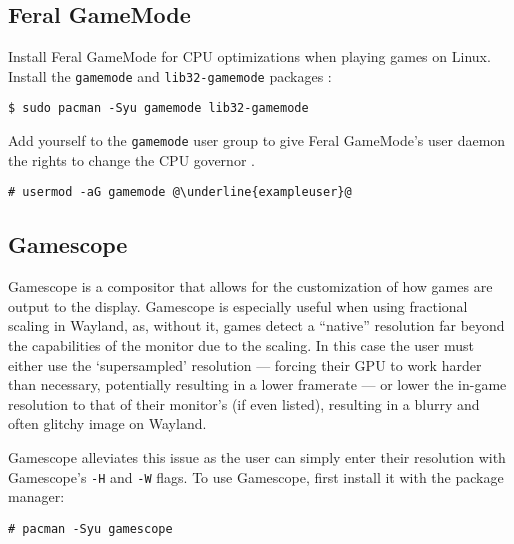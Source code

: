 \documentclass[a4paper]{article}
\begin{document}
\subsection{Feral GameMode}

Install Feral GameMode for CPU optimizations when playing games on Linux.
Install the \lstinline|gamemode| and \lstinline|lib32-gamemode| packages \cite{arch-wiki-gamemode}:

\begin{lstlisting}
$ sudo pacman -Syu gamemode lib32-gamemode
\end{lstlisting}

Add yourself to the \lstinline|gamemode| user group to give Feral GameMode's user daemon the rights to change the CPU governor \cite{arch-wiki-gamemode}.
\begin{lstlisting}[escapechar=@]
# usermod -aG gamemode @\underline{exampleuser}@
\end{lstlisting}

\subsection{Gamescope}

Gamescope is a compositor that allows for the customization of how games are output to the display.
Gamescope is especially useful when using fractional scaling in Wayland, as, without it, games detect a ``native'' resolution far beyond the capabilities of the monitor due to the scaling.
In this case the user must either use the `supersampled' resolution --- forcing their GPU to work harder than necessary, potentially resulting in a lower framerate --- or lower the in-game resolution to that of their monitor's (if even listed), resulting in a blurry and often glitchy image on Wayland.

Gamescope alleviates this issue as the user can simply enter their resolution with Gamescope's \lstinline|-H| and \lstinline|-W| flags.
To use Gamescope, first install it with the package manager:
\begin{lstlisting}
# pacman -Syu gamescope
\end{lstlisting}
\end{document}
